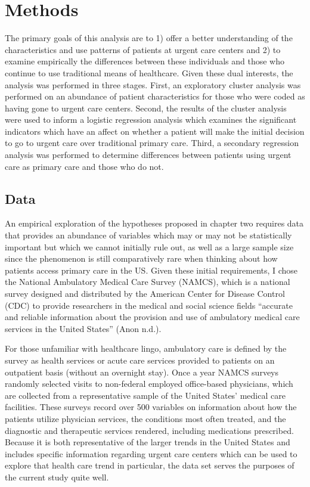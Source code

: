 \documentclass[12pt,twoside]{reedthesis}
\begin{document}
  \chapter*{Methods}\label{methods}
  
  \onehalfspacing
  
  The primary goals of this analysis are to 1) offer a better
  understanding of the characteristics and use patterns of patients at
  urgent care centers and 2) to examine empirically the differences
  between these individuals and those who continue to use traditional
  means of healthcare. Given these dual interests, the analysis was
  performed in three stages. First, an exploratory cluster analysis was
  performed on an abundance of patient characteristics for those who were
  coded as having gone to urgent care centers. Second, the results of the
  cluster analysis were used to inform a logistic regression analysis
  which examines the significant indicators which have an affect on
  whether a patient will make the initial decision to go to urgent care
  over traditional primary care. Third, a secondary regression analysis
  was performed to determine differences between patients using urgent
  care as primary care and those who do not.
  
  \section*{Data}\label{data}
  
  An empirical exploration of the hypotheses proposed in chapter two
  requires data that provides an abundance of variables which may or may
  not be statistically important but which we cannot initially rule out,
  as well as a large sample size since the phenomenon is still
  comparatively rare when thinking about how patients access primary care
  in the US. Given these initial requirements, I chose the National
  Ambulatory Medical Care Survey (NAMCS), which is a national survey
  designed and distributed by the American Center for Disease Control
  (CDC) to provide researchers in the medical and social science fields
  ``accurate and reliable information about the provision and use of
  ambulatory medical care services in the United States'' (Anon n.d.).
  
  For those unfamiliar with healthcare lingo, ambulatory care is defined
  by the survey as health services or acute care services provided to
  patients on an outpatient basis (without an overnight stay). Once a year
  NAMCS surveys randomly selected visits to non-federal employed
  office-based physicians, which are collected from a representative
  sample of the United States' medical care facilities. These surveys
  record over 500 variables on information about how the patients utilize
  physician services, the conditions most often treated, and the
  diagnostic and therapeutic services rendered, including medications
  prescribed. Because it is both representative of the larger trends in
  the United States and includes specific information regarding urgent
  care centers which can be used to explore that health care trend in
  particular, the data set serves the purposes of the current study quite
  well.
  
\end{document}
